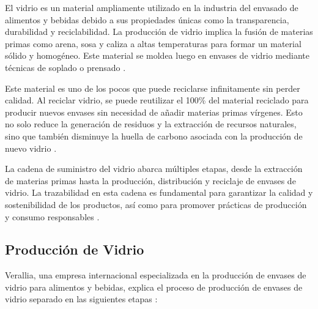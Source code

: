 \documentclass[main.tex]{subfiles}
\begin{document}
El vidrio es un material ampliamente utilizado en la industria del envasado de alimentos y bebidas debido a sus propiedades únicas como la transparencia, durabilidad y reciclabilidad. La producción de vidrio implica la fusión de materias primas como arena, sosa y caliza a altas temperaturas para formar un material sólido y homogéneo. Este material se moldea luego en envases de vidrio mediante técnicas de soplado o prensado \cite{verallia2022vidrio}.

Este material es uno de los pocos que puede reciclarse infinitamente sin perder calidad. Al reciclar vidrio, se puede reutilizar el 100\% del material reciclado para producir nuevos envases sin necesidad de añadir materias primas vírgenes. Esto no solo reduce la generación de residuos y la extracción de recursos naturales, sino que también disminuye la huella de carbono asociada con la producción de nuevo vidrio \cite{verallia2022vidrio}.

La cadena de suministro del vidrio abarca múltiples etapas, desde la extracción de materias primas hasta la producción, distribución y reciclaje de envases de vidrio. La trazabilidad en esta cadena es fundamental para garantizar la calidad y sostenibilidad de los productos, así como para promover prácticas de producción y consumo responsables \cite{verallia2022vidrio}.

\subsection{Producción de Vidrio}

Verallia, una empresa internacional especializada en la producción de envases de vidrio para alimentos y bebidas, explica el proceso de producción de envases de vidrio separado en las siguientes etapas \cite{prodvidrio2024verallia}:
\end{document}
